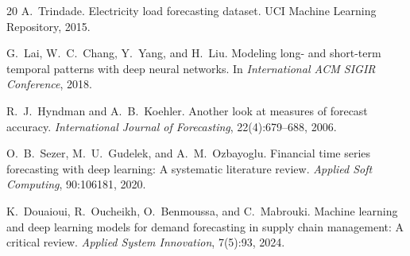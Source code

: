 \documentclass[11pt]{article}
\begin{document}
\begin{thebibliography}{20}
A.~Trindade.
\newblock Electricity load forecasting dataset.
\newblock UCI Machine Learning Repository, 2015.

G.~Lai, W.~C.~Chang, Y.~Yang, and H.~Liu.
\newblock Modeling long- and short-term temporal patterns with deep neural networks.
\newblock In \emph{International ACM SIGIR Conference}, 2018.

R.~J.~Hyndman and A.~B.~Koehler.
\newblock Another look at measures of forecast accuracy.
\newblock \emph{International Journal of Forecasting}, 22(4):679--688, 2006.

O.~B.~Sezer, M.~U.~Gudelek, and A.~M.~Ozbayoglu.
\newblock Financial time series forecasting with deep learning: A systematic literature review.
\newblock \emph{Applied Soft Computing}, 90:106181, 2020.

K.~Douaioui, R.~Oucheikh, O.~Benmoussa, and C.~Mabrouki.
\newblock Machine learning and deep learning models for demand forecasting in
  supply chain management: A critical review.
\newblock \emph{Applied System Innovation}, 7(5):93, 2024.

\end{thebibliography}
\end{document}
